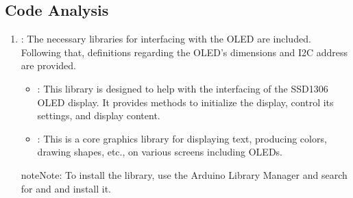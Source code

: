 \documentclass[a4paper,11pt,english]{sphinxmanual}
\begin{document}
\subsection{Code Analysis}
\label{\detokenize{Basic_Project/0.96_inch_OLED:code-analysis}}\begin{enumerate}
%
\item {} 
\sphinxAtStartPar
{}:
The necessary libraries for interfacing with the OLED are included. Following that, definitions regarding the OLED’s dimensions and I2C address are provided.
\begin{itemize}
\item {} 
\sphinxAtStartPar
{}: This library is designed to help with the interfacing of the SSD1306 OLED display. It provides methods to initialize the display, control its settings, and display content.

\item {} 
\sphinxAtStartPar
{}: This is a core graphics library for displaying text, producing colors, drawing shapes, etc., on various screens including OLEDs.

\end{itemize}

\begin{sphinxadmonition}{note}{Note:}
\sphinxAtStartPar
To install the library, use the Arduino Library Manager and search for  and  and install it.
\end{sphinxadmonition}

\begin{sphinxVerbatim}[commandchars=\\\{\}]


\end{sphinxVerbatim}


\end{enumerate}
\end{document}
